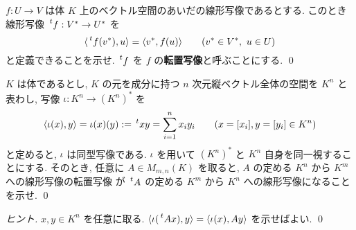 \documentclass[12pt,twoside]{jarticle}
\begin{document}

\begin{question}[転置写像, 10点]
  $f:U\to V$ は体 $K$ 上のベクトル空間のあいだの線形写像であるとする.
  このとき線形写像 $\tp{f}:V^*\to U^*$ を
  \begin{equation*}
    \bra \tp{f}(v^*), u \ket = \bra v^*, f(u)\ket
    \qquad (v^*\in V^*,\ u\in U)
  \end{equation*}
  と定義できることを示せ.  $\tp{f}$ を $f$ の{\bf 転置写像}と呼ぶことにする.
  \qed
\end{question}


\begin{question}[行列の転置との関係, 10点]
  $K$ は体であるとし, 
  $K$ の元を成分に持つ $n$ 次元縦ベクトル全体の空間を $K^n$ と表わし, 
  写像 $\iota:K^n\to(K^n)^*$ を
  \begin{equation*}
    \bra \iota(x), y\ket = \iota(x)(y) := \tp{x}y = \sum_{i=1}^n x_iy_i
    \qquad (x=[x_i], y=[y_i] \in K^n)
  \end{equation*}
  と定めると, $\iota$ は同型写像である. 
  $\iota$ を用いて $(K^n)^*$ と $K^n$ 自身を同一視することにする.
  そのとき, 任意に $A\in M_{m,n}(K)$ を取ると, 
  $A$ の定める $K^n$ から $K^m$ への線形写像の転置写像
  が $\tp{A}$ の定める $K^m$ から $K^n$ への線形写像になることを示せ.
  \qed
\end{question}

\begin{proof}[ヒント]
  $x,y\in K^n$ を任意に取る.
  $\bra \iota(\tp{A}x), y\ket = \bra \iota(x),Ay\ket$ を示せばよい.
  \qed
\end{proof}

\end{document}

